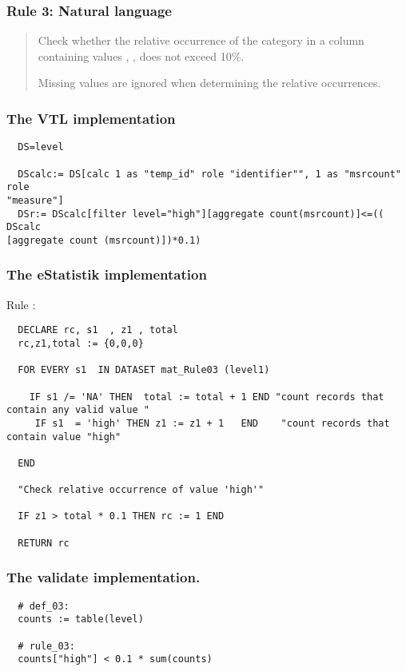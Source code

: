 \newpage

\subsubsection*{  Rule 3: Natural language}
\begin{quote}


Check whether the relative occurrence of the category  in a column containing values , ,  does not exceed 10\%.

Missing values are ignored when determining the relative occurrences.


\end{quote}

\subsubsection*{The VTL implementation}
\begin{verbatim}
  DS=level

  DScalc:= DS[calc 1 as "temp_id" role "identifier"", 1 as "msrcount" role
"measure"]
  DSr:= DScalc[filter level="high"][aggregate count(msrcount)]<=(( DScalc
[aggregate count (msrcount)])*0.1)
\end{verbatim}

\subsubsection*{The eStatistik implementation}
\noindent
Rule :
\begin{verbatim}
  DECLARE rc, s1  , z1 , total
  rc,z1,total := {0,0,0}

  FOR EVERY s1  IN DATASET mat_Rule03 (level1)

    IF s1 /= 'NA' THEN  total := total + 1 END "count records that contain any valid value "
     IF s1  = 'high' THEN z1 := z1 + 1   END    "count records that contain value "high"

  END

  "Check relative occurrence of value 'high'"

  IF z1 > total * 0.1 THEN rc := 1 END

  RETURN rc
\end{verbatim}

\subsubsection*{The validate implementation.}
\begin{verbatim}
  # def_03:
  counts := table(level)

  # rule_03:
  counts["high"] < 0.1 * sum(counts)
\end{verbatim}


